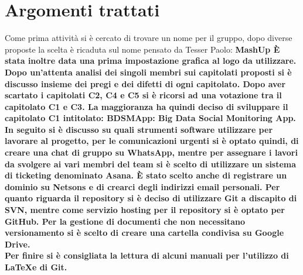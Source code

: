 %

\section{Argomenti trattati}
   Come prima attività si è cercato di trovare un nome per il gruppo, dopo diverse proposte la scelta è ricaduta sul nome pensato da Tesser Paolo: \bfseries{MashUp} \textnormal{È stata inoltre data una prima impostazione grafica al logo da utilizzare.}\\
   \textnormal{Dopo un'attenta analisi dei singoli membri sui capitolati proposti si è discusso  insieme dei pregi e dei difetti di ogni capitolato. Dopo aver scartato i capitolati C2, C4 e C5 si è ricorsi ad una votazione tra il capitolato C1 e C3. La maggioranza ha quindi deciso di sviluppare il capitolato \bfseries{C1} \textnormal{intitolato:} \bfseries{BDSMApp: Big Data Social Monitoring App}\textnormal{.}}\\
  \textnormal{In seguito si è discusso su quali strumenti software utilizzare per lavorare al progetto, per le comunicazioni urgenti si è optato quindi, di creare una chat di gruppo su WhatsApp, mentre per assegnare i lavori da svolgere ai vari membri del team si è scelto di utilizzare un sistema di ticketing denominato Asana.
  È stato scelto anche di registrare un dominio su Netsons e di crearci degli indirizzi email personali.
  Per quanto riguarda il repository si è deciso di utilizzare Git a discapito di SVN, mentre come servizio hosting per il repository si è optato per GitHub. Per la gestione di documenti che non necessitano versionamento si è scelto di creare una cartella condivisa su Google Drive.}\\
  \textnormal{Per finire si è consigliata la lettura di alcuni manuali per l'utilizzo di \LaTeX e di Git.}
